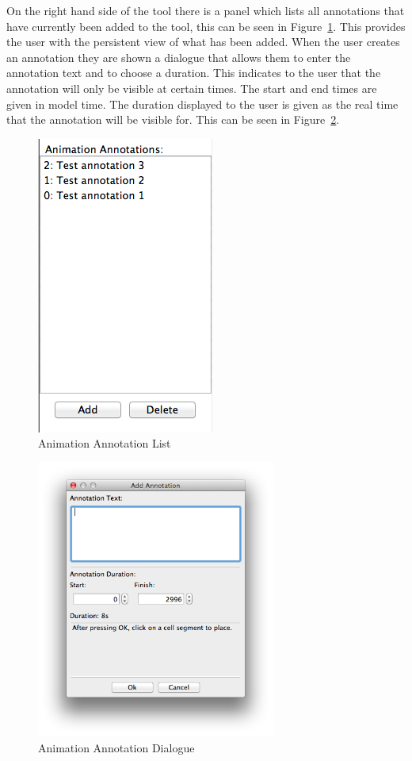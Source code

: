 On the right hand side of the tool there is a panel which lists all annotations that have currently been added to the tool, this can be seen in Figure~\ref{fig:annotation_list}.  This provides the user with the persistent view of what has been added.  When the user creates an annotation they are shown a dialogue that allows them to enter the annotation text and to choose a duration.  This indicates to the user that the annotation will only be visible at certain times.  The start and end times are given in model time.  The duration displayed to the user is given as the real time that the annotation will be visible for.  This can be seen in Figure~\ref{fig:annotation_dialog}.

\begin{figure}[h!]
    \centering
    \includegraphics[height=0.4\textheight]{images/annotation_list.png}
    \caption{Animation Annotation List}
    \label{fig:annotation_list}
\end{figure}

\begin{figure}[h!]
    \centering
    \includegraphics[width=0.7\textwidth]{images/annotation_dialog.png}
    \caption{Animation Annotation Dialogue}
    \label{fig:annotation_dialog}
\end{figure}

